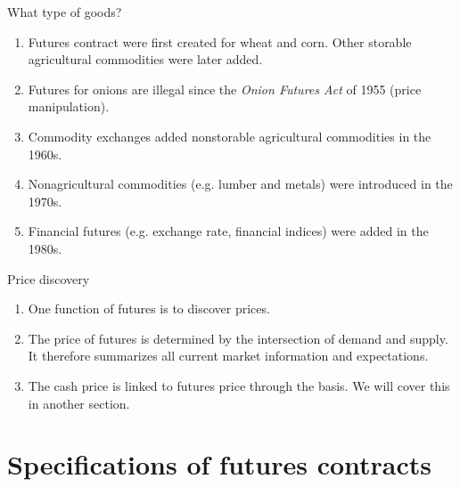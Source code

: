 \documentclass[table,xcolor=pdftex,dvipsnames]{beamer}\usepackage[]{graphicx}\usepackage[]{color}
\begin{document}
\begin{frame}{What type of goods?}
\begin{enumerate}[label=\textbullet]
    \item Futures contract were first created for wheat and corn. Other storable agricultural commodities were later added.
    \item Futures for onions are illegal since the \emph{Onion Futures Act} of 1955 (price manipulation).
    \item Commodity exchanges added nonstorable agricultural commodities in the 1960s.
    \item Nonagricultural commodities (e.g. lumber and metals) were introduced in the 1970s.
    \item Financial futures (e.g. exchange rate, financial indices) were added in the 1980s.
\end{enumerate}
\end{frame}


\begin{frame}{Price discovery}
\begin{enumerate}[label=\textbullet]
    \item One function of futures is to discover prices.
    \item The price of futures is determined by the intersection of demand and supply. It therefore summarizes all current market information and expectations.
    \item The cash price is linked to futures price through the basis. We will cover this in another section.
\end{enumerate}
\end{frame}


\section{Specifications of futures contracts}
\end{document}

